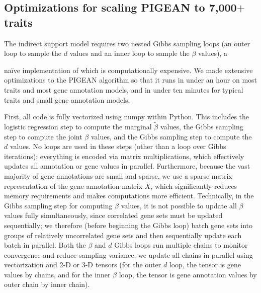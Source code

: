 \documentclass[11pt]{article}
\begin{document}
\subsection{Optimizations for scaling PIGEAN to 7,000$+$ traits}

The indirect support model requires two nested Gibbs sampling loops
(an outer loop to sample the $d$ values and an inner loop to sample
the $\beta$ values), a {na\"ive implementation of which is
computationally expensive. We made extensive optimizations to the
PIGEAN algorithm so that it runs in under an hour on most traits and
most gene annotation models, and in under ten minutes for typical
traits and small gene annotation models. 

First, all code is fully vectorized using numpy within Python. This
includes the logistic regression step to compute the marginal
$\tilde{\beta}$ values, the Gibbs sampling step to compute the joint
$\beta$ values, and the Gibbs sampling step to compute the $d$
values. No loops are used in these steps (other than a loop over Gibbs
iterations); everything is encoded via matrix multiplications, which
effectively updates all annotation or gene values in
parallel. Furthermore, because the vast majority of gene annotations
are small and sparse, we use a sparse matrix representation of the
gene annotation matrix $X$, which significantly reduces memory
requirements and makes computations more efficient. Technically, in
the Gibbs sampling step for computing $\beta$ values, it is not
possible to update all $\beta$ values fully simultaneously, since
correlated gene sets must be updated sequentially; we therefore
(before beginning the Gibbs loop) batch gene sets into groups of
relatively uncorrelated gene sets and then sequentially update each
batch in parallel. Both the $\beta$ and $d$ Gibbs loops run multiple
chains to monitor convergence and reduce sampling variance; we
update all chains in parallel using vectorization and 2-D or 3-D
tensors (for the outer $d$ loop, the tensor is gene values by
chains, and for the inner $\beta$ loop, the tensor is gene annotation
values by outer chain by inner chain). 

}
\end{document}
